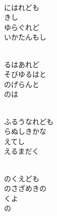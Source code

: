 \documentclass[10pt,b5j]{tarticle} %
\begin{document}
\vspace{1.5em} %
\newcommand{\linespace}{0.5em} %
\newcommand{\blocksize}{0.5\hsize} %
\newcommand{\itemmargin}{6em} %
\begin{enumerate} %
    \setlength{\itemindent}{\itemmargin} %
    \begin{minipage}[c]{\blocksize}
    
        \vspace{\linespace}
        \item~\\
        にはれども\\
        きし\\
        ゆらぐれど\\
        いかたんもし
        
        \vspace{\linespace}
        \item~\\
        るはあれど\\
        そびゆるはと\\
        のげらんと\\
        のは
        
        \vspace{\linespace}
        \item~\\
        ふるうなれども\\
        らぬしきかな\\
        えてし\\
        えるまだく
        
        \vspace{\linespace}
        \item~\\
        のくえども\\
        のさざめきの\\
        くよ\\
        の
        

\end{minipage}
\end{enumerate}
\end{document}
